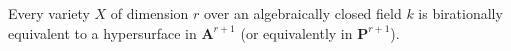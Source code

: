 Every variety $X$ of dimension $r$ over an algebraically closed field $k$ is birationally equivalent to a hypersurface in $\mathbf{A}^{r+1}$ (or equivalently in $\mathbf{P}^{r+1}$).
